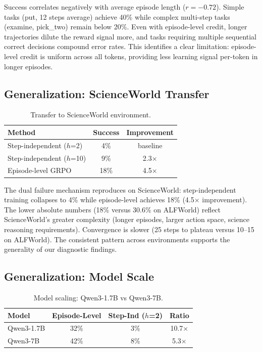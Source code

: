 \documentclass[11pt]{article}
\begin{document}
Success correlates negatively with average episode length ($r=-0.72$). Simple tasks (put, 12 steps average) achieve 40\% while complex multi-step tasks (examine, pick\_two) remain below 20\%. Even with episode-level credit, longer trajectories dilute the reward signal more, and tasks requiring multiple sequential correct decisions compound error rates. This identifies a clear limitation: episode-level credit is uniform across all tokens, providing less learning signal per-token in longer episodes.

\subsection{Generalization: ScienceWorld Transfer}

\begin{table}[h]
\centering
\caption{Transfer to ScienceWorld environment.}
\label{tab:sciworld}
\begin{tabular}{lcc}
\toprule
Method & Success & Improvement \\
\midrule
Step-independent ($h$=2) & 4\% & baseline \\
Step-independent ($h$=10) & 9\% & 2.3$\times$ \\
Episode-level GRPO & 18\% & 4.5$\times$ \\
\bottomrule
\end{tabular}
\end{table}

The dual failure mechanism reproduces on ScienceWorld: step-independent training collapses to 4\% while episode-level achieves 18\% (4.5$\times$ improvement). The lower absolute numbers (18\% versus 30.6\% on ALFWorld) reflect ScienceWorld's greater complexity (longer episodes, larger action space, science reasoning requirements). Convergence is slower (25 steps to plateau versus 10--15 on ALFWorld). The consistent pattern across environments supports the generality of our diagnostic findings.

\subsection{Generalization: Model Scale}

\begin{table}[h]
\centering
\caption{Model scaling: Qwen3-1.7B vs Qwen3-7B.}
\label{tab:scale}
\begin{tabular}{lccc}
\toprule
Model & Episode-Level & Step-Ind ($h$=2) & Ratio \\
\midrule
Qwen3-1.7B & 32\% & 3\% & 10.7$\times$ \\
Qwen3-7B & 42\% & 8\% & 5.3$\times$ \\
\bottomrule
\end{tabular}
\end{table}
\end{document}
